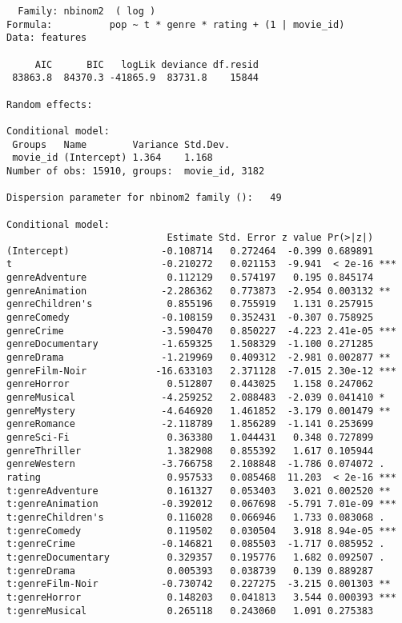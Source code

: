 \begin{verbatim}
  Family: nbinom2  ( log )
Formula:          pop ~ t * genre * rating + (1 | movie_id)
Data: features

     AIC      BIC   logLik deviance df.resid
 83863.8  84370.3 -41865.9  83731.8    15844

Random effects:

Conditional model:
 Groups   Name        Variance Std.Dev.
 movie_id (Intercept) 1.364    1.168
Number of obs: 15910, groups:  movie_id, 3182

Dispersion parameter for nbinom2 family ():   49

Conditional model:
                            Estimate Std. Error z value Pr(>|z|)
(Intercept)                -0.108714   0.272464  -0.399 0.689891
t                          -0.210272   0.021153  -9.941  < 2e-16 ***
genreAdventure              0.112129   0.574197   0.195 0.845174
genreAnimation             -2.286362   0.773873  -2.954 0.003132 **
genreChildren's             0.855196   0.755919   1.131 0.257915
genreComedy                -0.108159   0.352431  -0.307 0.758925
genreCrime                 -3.590470   0.850227  -4.223 2.41e-05 ***
genreDocumentary           -1.659325   1.508329  -1.100 0.271285
genreDrama                 -1.219969   0.409312  -2.981 0.002877 **
genreFilm-Noir            -16.633103   2.371128  -7.015 2.30e-12 ***
genreHorror                 0.512807   0.443025   1.158 0.247062
genreMusical               -4.259252   2.088483  -2.039 0.041410 *
genreMystery               -4.646920   1.461852  -3.179 0.001479 **
genreRomance               -2.118789   1.856289  -1.141 0.253699
genreSci-Fi                 0.363380   1.044431   0.348 0.727899
genreThriller               1.382908   0.855392   1.617 0.105944
genreWestern               -3.766758   2.108848  -1.786 0.074072 .
rating                      0.957533   0.085468  11.203  < 2e-16 ***
t:genreAdventure            0.161327   0.053403   3.021 0.002520 **
t:genreAnimation           -0.392012   0.067698  -5.791 7.01e-09 ***
t:genreChildren's           0.116028   0.066946   1.733 0.083068 .
t:genreComedy               0.119502   0.030504   3.918 8.94e-05 ***
t:genreCrime               -0.146821   0.085503  -1.717 0.085952 .
t:genreDocumentary          0.329357   0.195776   1.682 0.092507 .
t:genreDrama                0.005393   0.038739   0.139 0.889287
t:genreFilm-Noir           -0.730742   0.227275  -3.215 0.001303 **
t:genreHorror               0.148203   0.041813   3.544 0.000393 ***
t:genreMusical              0.265118   0.243060   1.091 0.275383

\end{verbatim}
